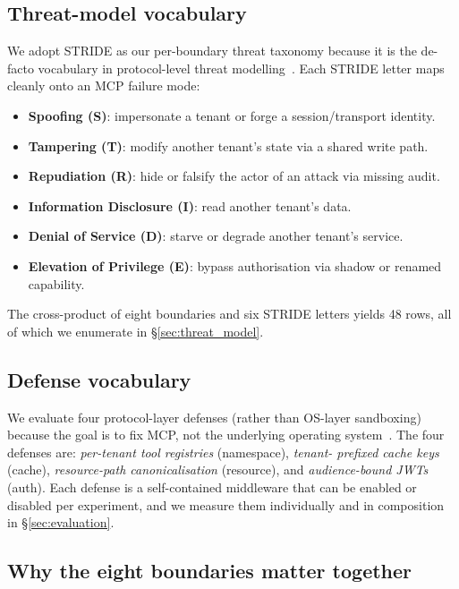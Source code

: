 \subsection{Threat-model vocabulary}

We adopt STRIDE as our per-boundary threat taxonomy because it
is the de-facto vocabulary in protocol-level threat
modelling~\cite{stride_orig}. Each STRIDE letter maps cleanly
onto an MCP failure mode:

\begin{itemize}
  \item \textbf{Spoofing (S)}: impersonate a tenant or forge a
        session/transport identity.
  \item \textbf{Tampering (T)}: modify another tenant's state
        via a shared write path.
  \item \textbf{Repudiation (R)}: hide or falsify the actor of
        an attack via missing audit.
  \item \textbf{Information Disclosure (I)}: read another
        tenant's data.
  \item \textbf{Denial of Service (D)}: starve or degrade
        another tenant's service.
  \item \textbf{Elevation of Privilege (E)}: bypass authorisation
        via shadow or renamed capability.
\end{itemize}

The cross-product of eight boundaries and six STRIDE letters
yields 48 rows, all of which we enumerate in
\S\ref{sec:threat_model}.

\subsection{Defense vocabulary}

We evaluate four protocol-layer defenses (rather than OS-layer
sandboxing) because the goal is to fix MCP, not the underlying
operating system~\cite{dipta_2024_sandbox}. The four defenses
are: \emph{per-tenant tool registries} (namespace), \emph{tenant-
prefixed cache keys} (cache), \emph{resource-path
canonicalisation} (resource), and \emph{audience-bound JWTs}
(auth). Each defense is a self-contained middleware that can be
enabled or disabled per experiment, and we measure them
individually and in composition in \S\ref{sec:evaluation}.

\subsection{Why the eight boundaries matter together}

